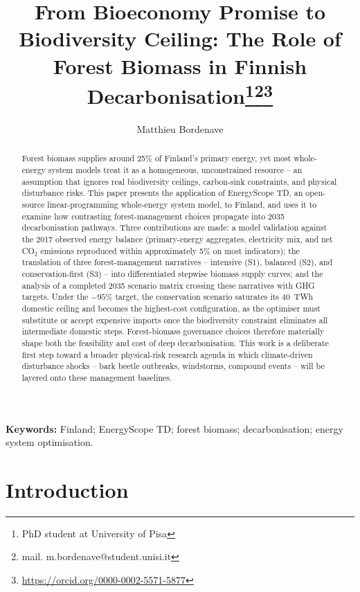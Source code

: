 \documentclass{article}
\title{From Bioeconomy Promise to Biodiversity Ceiling: The Role of Forest Biomass in Finnish Decarbonisation\footnote{PhD student at University of Pisa}\footnote{mail. m.bordenave@student.unisi.it}\footnote{\url{https://orcid.org/0000-0002-5571-5877}}}
\author{Matthieu Bordenave}
\date{}
\begin{document}
\maketitle{}
\begin{abstract}
Forest biomass supplies around 25\% of Finland's primary energy, yet most whole-energy system models treat it as a homogeneous, unconstrained resource -- an assumption that ignores real biodiversity ceilings, carbon-sink constraints, and physical disturbance risks. This paper presents the application of EnergyScope TD, an open-source linear-programming whole-energy system model, to Finland, and uses it to examine how contrasting forest-management choices propagate into 2035 decarbonisation pathways. Three contributions are made: a model validation against the 2017 observed energy balance (primary-energy aggregates, electricity mix, and net CO$_2$ emissions reproduced within approximately 5\% on most indicators); the translation of three forest-management narratives -- intensive (S1), balanced (S2), and conservation-first (S3) -- into differentiated stepwise biomass supply curves; and the analysis of a completed 2035 scenario matrix crossing these narratives with GHG targets. Under the $-95\%$ target, the conservation scenario saturates its 40~TWh domestic ceiling and becomes the highest-cost configuration, as the optimiser must substitute or accept expensive imports once the biodiversity constraint eliminates all intermediate domestic steps. Forest-biomass governance choices therefore materially shape both the feasibility and cost of deep decarbonisation. This work is a deliberate first step toward a broader physical-risk research agenda in which climate-driven disturbance shocks -- bark beetle outbreaks, windstorms, compound events -- will be layered onto these management baselines.
\end{abstract}

\noindent\textbf{Keywords:} Finland; EnergyScope TD; forest biomass; decarbonisation; energy system optimisation.

\newpage

\section{Introduction}
\end{document}
